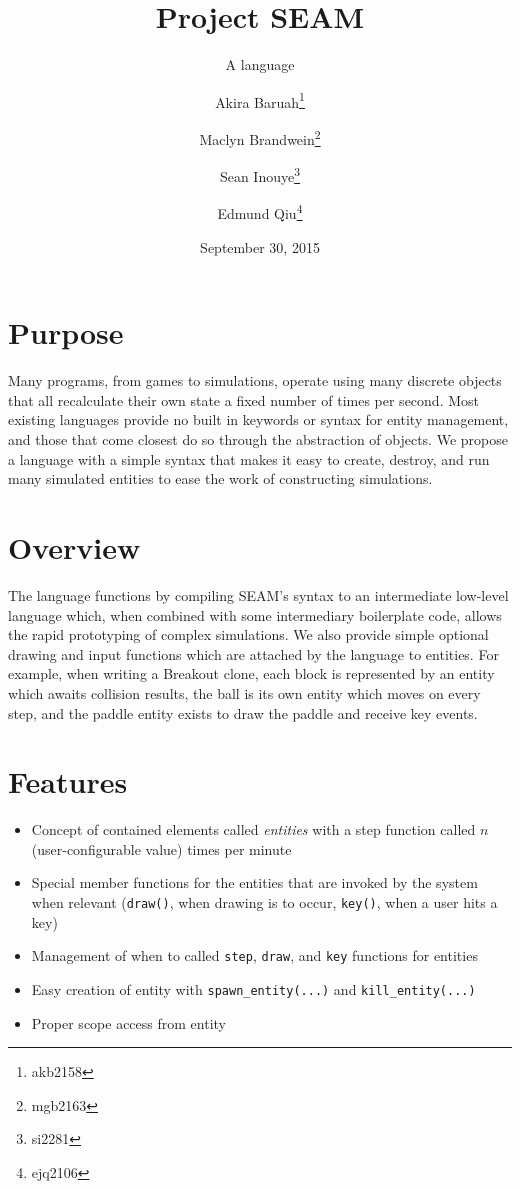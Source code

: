 \documentclass{scrartcl}
\title{Project SEAM}
\subtitle{A language}
\author[1]{Akira Baruah\thanks{akb2158}}
\author[1]{Maclyn Brandwein\thanks{mgb2163}}
\author[1]{Sean Inouye\thanks{si2281}}
\author[1]{Edmund Qiu\thanks{ejq2106}}
\affil{COMS 4115, Columbia University}
\date{September 30, 2015}
\begin{document}
\maketitle

\section{Purpose}

Many programs, from games to simulations, operate using many discrete objects that all recalculate their own state a fixed number of times per second. Most existing languages provide no built in keywords or syntax for entity management, and those that come closest do so through the abstraction of objects. We propose a language with a simple syntax that makes it easy to create, destroy, and run many simulated entities to ease the work of constructing simulations.

\section{Overview}

The language functions by compiling SEAM’s syntax to an intermediate low-level language which, when combined with some intermediary boilerplate code, allows the rapid prototyping of complex simulations. We also provide simple optional drawing and input functions which are attached by the language to entities. For example, when writing a Breakout clone, each block is represented by an entity which awaits collision results, the ball is its own entity which moves on every step, and the paddle entity exists to draw the paddle and receive key events.

\section{Features}

\begin{itemize}
\item Concept of contained elements called \emph{entities} with a step function called $n$ (user-configurable value) times per minute
\item Special member functions for the entities that are invoked by the system when relevant (\verb|draw()|, when drawing is to occur, \verb|key()|, when a user hits a key)
\item Management of when to called \verb|step|, \verb|draw|, and \verb|key| functions for entities
\item Easy creation of entity with \verb|spawn_entity(...)| and \verb|kill_entity(...)|
\item Proper scope access from entity 
\end{itemize}
\end{document}
